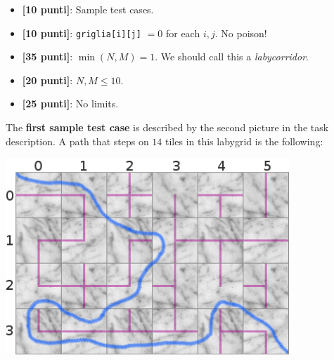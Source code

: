 \begin{itemize}[nolistsep,itemsep=2mm]
  \item \textbf{ [10 punti]}: Sample test cases.
  \item \textbf{ [10 punti]}: \texttt{griglia[i][j]} $=0$ for each $i, j$. No poison!
  \item \textbf{ [35 punti]}: $\min(N, M) = 1$. We should call this a \emph{labycorridor}.
  \item \textbf{ [20 punti]}: $N, M \le 10$.
  \item \textbf{ [25 punti]}: No limits.
\end{itemize}



\Examples
\begin{example}
%
%
\end{example}


\Explanation
The \textbf{first sample test case} is described by the second picture in the task description. A path that steps on $14$ tiles in this labygrid is the following:

\begin{center}
  \includegraphics[width=0.8\textwidth]{floor-poison-path.png}
\end{center}
